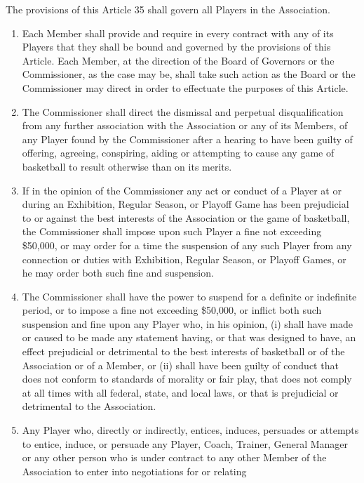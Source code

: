 \documentclass[]{book}
\providecommand{\tightlist}{%
  \setlength{\itemsep}{0pt}\setlength{\parskip}{0pt}}
\theoremstyle{definition}
\theoremstyle{definition}
\theoremstyle{definition}
\theoremstyle{remark}
\begin{document}
The provisions of this Article 35 shall govern all Players in the
Association.

\begin{enumerate}
\def\labelenumi{(\alph{enumi})}
\tightlist
\item
  Each Member shall provide and require in every contract with any of
  its Players that they shall be bound and governed by the provisions of
  this Article. Each Member, at the direction of the Board of Governors
  or the Commissioner, as the case may be, shall take such action as the
  Board or the Commissioner may direct in order to effectuate the
  purposes of this Article.
\item
  The Commissioner shall direct the dismissal and perpetual
  disqualification from any further association with the Association or
  any of its Members, of any Player found by the Commissioner after a
  hearing to have been guilty of offering, agreeing, conspiring, aiding
  or attempting to cause any game of basketball to result otherwise than
  on its merits.
\item
  If in the opinion of the Commissioner any act or conduct of a Player
  at or during an Exhibition, Regular Season, or Playoff Game has been
  prejudicial to or against the best interests of the Association or the
  game of basketball, the Commissioner shall impose upon such Player a
  fine not exceeding \$50,000, or may order for a time the suspension of
  any such Player from any connection or duties with Exhibition, Regular
  Season, or Playoff Games, or he may order both such fine and
  suspension.
\item
  The Commissioner shall have the power to suspend for a definite or
  indefinite period, or to impose a fine not exceeding \$50,000, or
  inflict both such suspension and fine upon any Player who, in his
  opinion, (i) shall have made or caused to be made any statement
  having, or that was designed to have, an effect prejudicial or
  detrimental to the best interests of basketball or of the Association
  or of a Member, or (ii) shall have been guilty of conduct that does
  not conform to standards of morality or fair play, that does not
  comply at all times with all federal, state, and local laws, or that
  is prejudicial or detrimental to the Association.
\item
  Any Player who, directly or indirectly, entices, induces, persuades or
  attempts to entice, induce, or persuade any Player, Coach, Trainer,
  General Manager or any other person who is under contract to any other
  Member of the Association to enter into negotiations for or relating

\end{enumerate}
\end{document}
